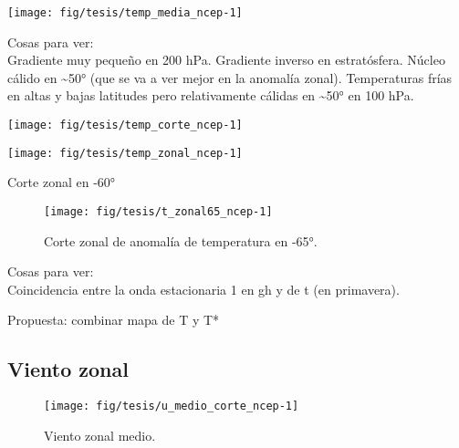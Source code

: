 \documentclass[es-AR,]{tufte-book}
\begin{document}
\begin{figure*}

{\centering \texttt{[image: fig/tesis/temp\_media\_ncep-1]} 

}

\end{figure*}

Cosas para ver:\\
Gradiente muy pequeño en 200 hPa. Gradiente inverso en estratósfera.
Núcleo cálido en \textasciitilde{}50° (que se va a ver mejor en la
anomalía zonal). Temperaturas frías en altas y bajas latitudes pero
relativamente cálidas en \textasciitilde{}50° en 100 hPa.

\begin{center}\texttt{[image: fig/tesis/temp\_corte\_ncep-1]} \end{center}

\begin{figure*}

{\centering \texttt{[image: fig/tesis/temp\_zonal\_ncep-1]} 

}

\end{figure*}

Corte zonal en -60°

\begin{figure}

{\centering \texttt{[image: fig/tesis/t\_zonal65\_ncep-1]} 

}

\caption[Corte zonal de anomalía de temperatura en -65°]{Corte zonal de anomalía de temperatura en -65°.}\label{fig:t_zonal65_ncep}
\end{figure}

Cosas para ver:\\
Coincidencia entre la onda estacionaria 1 en gh y de t (en primavera).

Propuesta: combinar mapa de T y T*

\subsection{Viento zonal}\label{viento-zonal}

\begin{figure}

{\centering \texttt{[image: fig/tesis/u\_medio\_corte\_ncep-1]} 

}

\caption[Viento zonal medio]{Viento zonal medio.}\label{fig:u_medio_corte_ncep}
\end{figure}
\end{document}
